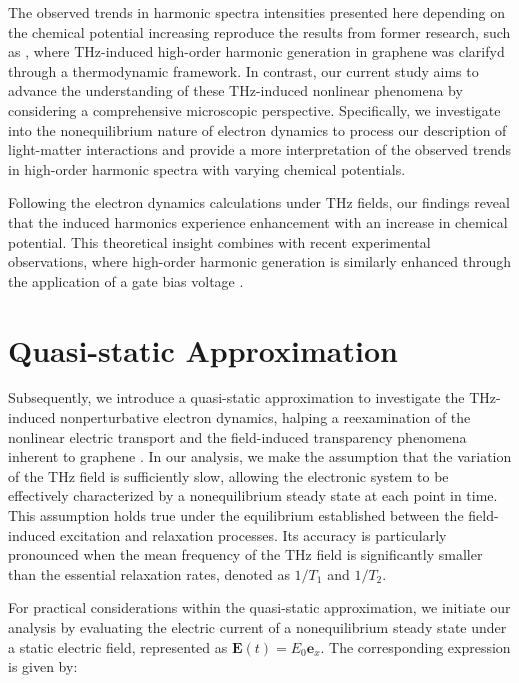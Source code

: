 The observed trends in harmonic spectra intensities presented here depending on the chemical potential increasing reproduce the results from former research, such as \cite{mics2015thermodynamic}, where THz-induced high-order harmonic generation in graphene was clarifyd through a thermodynamic framework. In contrast, our current study aims to advance the understanding of these THz-induced nonlinear phenomena by considering a comprehensive microscopic perspective. Specifically, we investigate into the nonequilibrium nature of electron dynamics to process our description of light-matter interactions and provide a more  interpretation of the observed trends in high-order harmonic spectra with varying chemical potentials.

Following the electron dynamics calculations under THz fields, our findings reveal that the induced harmonics experience enhancement with an increase in chemical potential. This theoretical insight combines with recent experimental observations, where high-order harmonic generation is similarly enhanced through the application of a gate bias voltage \cite{kovalev2021electrical}.
\section{Quasi-static Approximation}
Subsequently, we introduce a quasi-static approximation to investigate the THz-induced nonperturbative electron dynamics, halping a reexamination of the nonlinear electric transport and the field-induced transparency phenomena inherent to graphene \cite{sato2021nonlinear}.
In our analysis, we make the assumption that the variation of the THz field is sufficiently slow, allowing the electronic system to be effectively characterized by a nonequilibrium steady state at each point in time. This assumption holds true under the equilibrium established between the field-induced excitation and relaxation processes. Its accuracy is particularly pronounced when the mean frequency of the THz field is significantly smaller than the essential relaxation rates, denoted as $1/T_1$ and $1/T_2$.

For practical considerations within the quasi-static approximation, we initiate our analysis by evaluating the electric current of a nonequilibrium steady state under a static electric field, represented as $\mathbf E(t)=E_0 \mathbf e_x$. The corresponding expression is given by:


